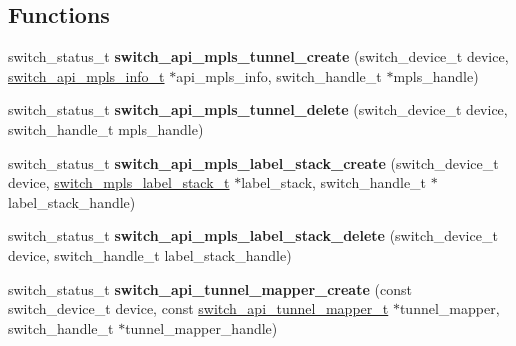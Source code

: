 \subsection*{Functions}
\begin{DoxyCompactItemize}
\item 
\hypertarget{group__Tunnel_ga4b3dd27e7774ae591300985844cc01af}{switch\+\_\+status\+\_\+t {\bfseries switch\+\_\+api\+\_\+mpls\+\_\+tunnel\+\_\+create} (switch\+\_\+device\+\_\+t device, \hyperlink{group__Tunnel_gab183bce9dc3bd5f8baa23b589e040674}{switch\+\_\+api\+\_\+mpls\+\_\+info\+\_\+t} $\ast$api\+\_\+mpls\+\_\+info, switch\+\_\+handle\+\_\+t $\ast$mpls\+\_\+handle)}\label{group__Tunnel_ga4b3dd27e7774ae591300985844cc01af}

\item 
\hypertarget{group__Tunnel_ga1e5321092c4e94225283c3dd0c9600a2}{switch\+\_\+status\+\_\+t {\bfseries switch\+\_\+api\+\_\+mpls\+\_\+tunnel\+\_\+delete} (switch\+\_\+device\+\_\+t device, switch\+\_\+handle\+\_\+t mpls\+\_\+handle)}\label{group__Tunnel_ga1e5321092c4e94225283c3dd0c9600a2}

\item 
\hypertarget{group__Tunnel_ga2dcc40ee02d03950140140343b1ce1f0}{switch\+\_\+status\+\_\+t {\bfseries switch\+\_\+api\+\_\+mpls\+\_\+label\+\_\+stack\+\_\+create} (switch\+\_\+device\+\_\+t device, \hyperlink{structswitch__mpls__label__stack__s}{switch\+\_\+mpls\+\_\+label\+\_\+stack\+\_\+t} $\ast$label\+\_\+stack, switch\+\_\+handle\+\_\+t $\ast$label\+\_\+stack\+\_\+handle)}\label{group__Tunnel_ga2dcc40ee02d03950140140343b1ce1f0}

\item 
\hypertarget{group__Tunnel_ga84dbbfaaada5e1211cb19df41829dbff}{switch\+\_\+status\+\_\+t {\bfseries switch\+\_\+api\+\_\+mpls\+\_\+label\+\_\+stack\+\_\+delete} (switch\+\_\+device\+\_\+t device, switch\+\_\+handle\+\_\+t label\+\_\+stack\+\_\+handle)}\label{group__Tunnel_ga84dbbfaaada5e1211cb19df41829dbff}

\item 
\hypertarget{group__Tunnel_ga25dac433293a2e57e0178560f9325e10}{switch\+\_\+status\+\_\+t {\bfseries switch\+\_\+api\+\_\+tunnel\+\_\+mapper\+\_\+create} (const switch\+\_\+device\+\_\+t device, const \hyperlink{group__Tunnel_gabce2bf13973701d284cb4c173ee4d9d7}{switch\+\_\+api\+\_\+tunnel\+\_\+mapper\+\_\+t} $\ast$tunnel\+\_\+mapper, switch\+\_\+handle\+\_\+t $\ast$tunnel\+\_\+mapper\+\_\+handle)}\label{group__Tunnel_ga25dac433293a2e57e0178560f9325e10}


\end{DoxyCompactItemize}
